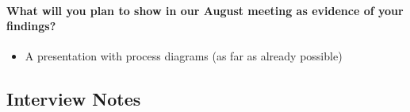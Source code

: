 \paragraph{What will you plan to show in our August meeting as evidence of your findings?}
\begin{itemize}
  \item A presentation with process diagrams (as far as already possible)
\end{itemize}

\subsection{Interview Notes}

